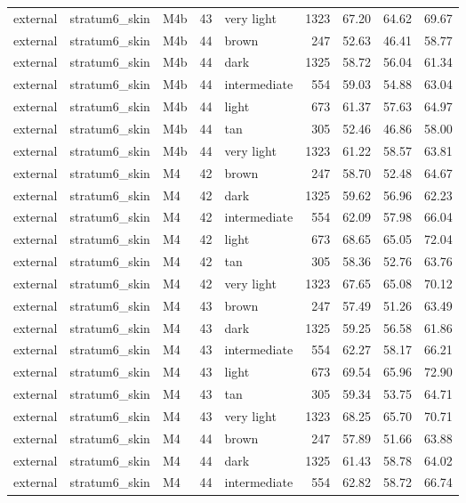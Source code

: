 \begin{tabular}{lllrlrrrr}
external & stratum6\_skin & M4b & 43 & very light & 1323 & 67.20 & 64.62 & 69.67 \\
external & stratum6\_skin & M4b & 44 & brown & 247 & 52.63 & 46.41 & 58.77 \\
external & stratum6\_skin & M4b & 44 & dark & 1325 & 58.72 & 56.04 & 61.34 \\
external & stratum6\_skin & M4b & 44 & intermediate & 554 & 59.03 & 54.88 & 63.04 \\
external & stratum6\_skin & M4b & 44 & light & 673 & 61.37 & 57.63 & 64.97 \\
external & stratum6\_skin & M4b & 44 & tan & 305 & 52.46 & 46.86 & 58.00 \\
external & stratum6\_skin & M4b & 44 & very light & 1323 & 61.22 & 58.57 & 63.81 \\
external & stratum6\_skin & M4 & 42 & brown & 247 & 58.70 & 52.48 & 64.67 \\
external & stratum6\_skin & M4 & 42 & dark & 1325 & 59.62 & 56.96 & 62.23 \\
external & stratum6\_skin & M4 & 42 & intermediate & 554 & 62.09 & 57.98 & 66.04 \\
external & stratum6\_skin & M4 & 42 & light & 673 & 68.65 & 65.05 & 72.04 \\
external & stratum6\_skin & M4 & 42 & tan & 305 & 58.36 & 52.76 & 63.76 \\
external & stratum6\_skin & M4 & 42 & very light & 1323 & 67.65 & 65.08 & 70.12 \\
external & stratum6\_skin & M4 & 43 & brown & 247 & 57.49 & 51.26 & 63.49 \\
external & stratum6\_skin & M4 & 43 & dark & 1325 & 59.25 & 56.58 & 61.86 \\
external & stratum6\_skin & M4 & 43 & intermediate & 554 & 62.27 & 58.17 & 66.21 \\
external & stratum6\_skin & M4 & 43 & light & 673 & 69.54 & 65.96 & 72.90 \\
external & stratum6\_skin & M4 & 43 & tan & 305 & 59.34 & 53.75 & 64.71 \\
external & stratum6\_skin & M4 & 43 & very light & 1323 & 68.25 & 65.70 & 70.71 \\
external & stratum6\_skin & M4 & 44 & brown & 247 & 57.89 & 51.66 & 63.88 \\
external & stratum6\_skin & M4 & 44 & dark & 1325 & 61.43 & 58.78 & 64.02 \\
external & stratum6\_skin & M4 & 44 & intermediate & 554 & 62.82 & 58.72 & 66.74 \\

\end{tabular}
